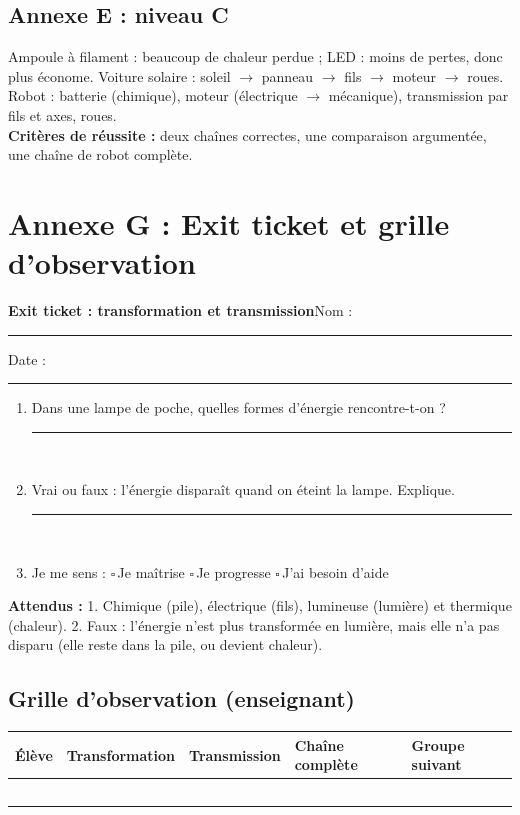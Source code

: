 \documentclass[11pt,a4paper]{article}
\newcommand{\cb}{$\square$\,}
\newcommand{\fl}{$\rightarrow$}
\newcommand{\lig}{\noindent\rule{\linewidth}{0.3pt}\\[5mm]}
\newcommand{\entete}[2]{%
  \begin{tcolorbox}[colback=#1!10,colframe=#1!70!black,boxrule=0.8pt,arc=2mm]
  {\Large\bfseries #2}\hfill Nom : \rule{4cm}{0.3pt}\quad Date : \rule{2.2cm}{0.3pt}
  \end{tcolorbox}}
\begin{document}
\subsection*{Annexe E : niveau C}
Ampoule à filament : beaucoup de chaleur perdue ; LED : moins de pertes, donc plus économe. Voiture solaire : soleil \fl{} panneau \fl{} fils \fl{} moteur \fl{} roues. Robot : batterie (chimique), moteur (électrique \fl{} mécanique), transmission par fils et axes, roues.\\
\textbf{Critères de réussite :} deux chaînes correctes, une comparaison argumentée, une chaîne de robot complète.

\newpage
\section*{Annexe G : Exit ticket et grille d'observation}
\entete{gray}{Exit ticket : transformation et transmission}

\begin{enumerate}
 \item Dans une lampe de poche, quelles formes d'énergie rencontre-t-on ?\\ \lig
 \item Vrai ou faux : l'énergie disparaît quand on éteint la lampe. Explique.\\ \lig
 \item Je me sens : \cb Je maîtrise \quad \cb Je progresse \quad \cb J'ai besoin d'aide
\end{enumerate}

\textbf{Attendus :} 1. Chimique (pile), électrique (fils), lumineuse (lumière) et thermique (chaleur). 2. Faux : l'énergie n'est plus transformée en lumière, mais elle n'a pas disparu (elle reste dans la pile, ou devient chaleur).

\bigskip
\subsection*{Grille d'observation (enseignant)}
\begin{tabularx}{\linewidth}{Y p{2.4cm} p{2.4cm} p{2.4cm} Y}
\toprule
Élève & Transformation & Transmission & Chaîne complète & Groupe suivant\\
\midrule
 & & & & \\ & & & & \\ & & & & \\ & & & & \\ & & & & \\
\bottomrule
\end{tabularx}
\end{document}
